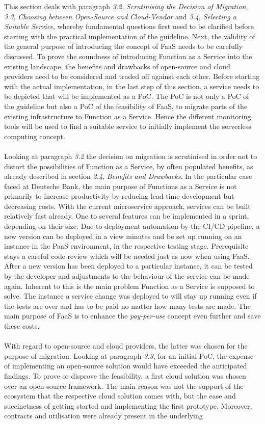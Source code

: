 \documentclass[a4paper,twoside,11pt, pagesize]{scrartcl}
\begin{document}
\begin{spacing}{1.2}
This section deals with paragraph \textit{3.2}, \textit{Scrutinising the Decision of Migration}, \textit{3.3}, \textit{Choosing between Open-Source and Cloud-Vendor} and \textit{3.4}, \textit{Selecting a Suitable Service}, whereby fundamental questions first need to be clarified before starting with the practical implementation of the guideline. Next, the validity of the general purpose of introducing the concept of FaaS needs to be carefully discussed. To prove the soundness of introducing Function as a Service into the existing landscape, the benefits and drawbacks of open-source and cloud providers need to be considered and traded off against each other. Before starting with the actual implementation, in the last step of this section, a service needs to be depicted that will be implemented as a PoC. The PoC is not only a PoC of the guideline but also a PoC of the feasibility of FaaS,  to migrate parts of the existing infrastructure to Function as a Service. Hence the different monitoring tools will be used to find a suitable service to initially implement the serverless computing concept. \\\\Looking at paragraph \textit{3.2} the decision on migration is scrutinised in order not to distort the possibilities of Function as a Service, by often populated benefits, as already described in section \textit{2.4}, \textit{Benefits and Drawbacks}. In the particular case faced at Deutsche Bank, the main purpose of Functions as a Service is not primarily to increase productivity by reducing lead-time development but decreasing costs. With the current microservice approach, services can be built relatively fast already. One to several features can be implemented in a sprint, depending on their size. Due to deployment automation by the CI/CD pipeline, a new version can be deployed in a view minutes and be set up running on an instance in the PaaS environment, in the respective testing stage. Prerequisite stays a careful code review which will be needed just as now when using FaaS. After a new version has been deployed to a particular instance, it can be tested by the developer and adjustments to the behaviour of the service can be made again. Inherent to this is the main problem Function as a Service is supposed to solve. The instance a service change was deployed to will stay up running even if the tests are over and has to be paid no matter how many tests are made. The main purpose of FaaS is to enhance the \textit{pay-per-use} concept even further and save these costs.\\\\ With regard to open-source and cloud providers, the latter was chosen for the purpose of migration. Looking at paragraph \textit{3.3}, for an initial PoC, the expense of implementing an open-source solution would have exceeded the anticipated findings. To prove or disprove the feasibility, a first cloud solution was chosen over an open-source framework. The main reason was not the support of the ecosystem that the respective cloud solution comes with, but the ease and succinctness of getting started and implementing the first prototype. Moreover, contracts and utilisation were already present in the underlying 
\end{spacing}
\end{document}
